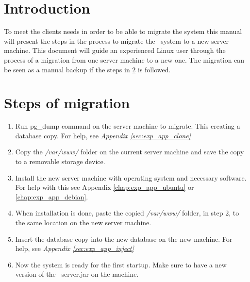 \label{chap:exp_app_migration}
\section{Introduction}
To meet the clients needs in order to be able to migrate the system this manual will present the steps in the process to migrate the \appName\ system to a new server machine. This document will guide an experienced Linux user through the process of a migration from one server machine to a new one. The migration can be seen as a manual backup if the steps in \ref{sec:exp_steps} is followed. 

\section{Steps of migration}\label{sec:exp_steps}
\begin{enumerate}
	\item Run pg\_dump command on the server machine to migrate. This creating a database copy. For help, see \emph{Appendix \ref{sec:exp_app_clone}}
	\item Copy the \emph{/var/www/} folder on the current server machine and save the copy to a removable storage device.
	\item Install the new server machine with operating system and necessary software. For help with this see Appendix \ref{chap:exp_app_ubuntu} or \ref{chap:exp_app_debian}.
	\item When installation is done, paste the copied \emph{/var/www/} folder, in step 2, to the same location on the new server machine. 
	\item Insert the database copy into the new database on the new machine. For help, see \emph{Appendix \ref{sec:exp_app_inject}}
	\item Now the system is ready for the first startup. Make sure to have a new version of the \appName\ server.jar on the machine.
\end{enumerate}


